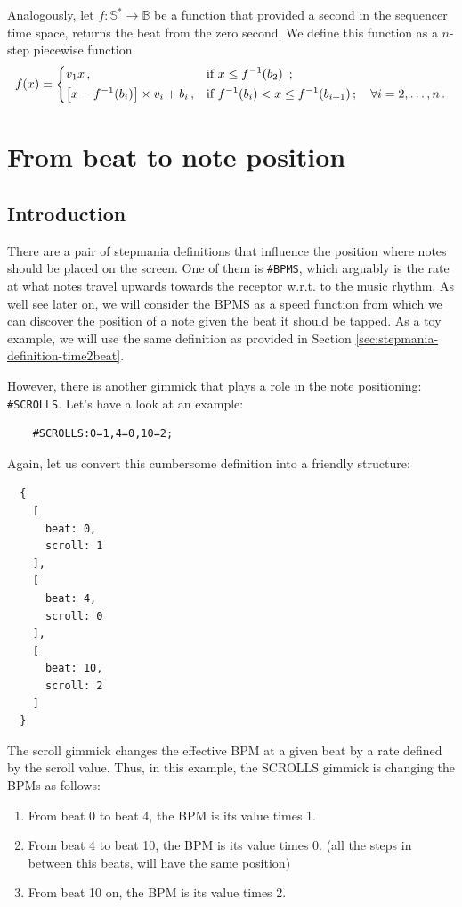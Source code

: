 \documentclass[a4paper,9pt]{article}
\begin{document}
    Analogously, let $ f: \mathbb{S^{*}} \rightarrow \mathbb{B} $ be a function that provided a second in the sequencer time space, returns the beat from the zero second. We define this function as a $n$-step piecewise function
    \begin{equation}
	    f(x) = \begin{dcases}
		    v_1x\,, & \text{if $x \leq f^{-1}(b_{2}) $ }\,;\\
		    \left[x-f^{-1}(b_{i})\right]\times v_i + b_{i}\,, & \text{if $f^{-1}(b_{i}) < x \leq f^{-1}(b_{i+1})\,;\quad \forall i=2,\ldots,n$}\,. \\
	    \end{dcases}
	    \label{eq:beat2second}
    \end{equation}

    \section{From beat to note position}

    \subsection{Introduction}

    There are a pair of stepmania definitions that influence the position where notes should be placed on the screen. One of them is \texttt{\#BPMS}, which arguably is the rate at what notes travel upwards towards the receptor w.r.t. to the music rhythm. As well see later on, we will consider the BPMS as a speed function from which we can discover the position of a note given the beat it should be tapped. As a toy example, we will use the same definition as provided in Section \ref{sec:stepmania-definition-time2beat}. 

    However, there is another gimmick that plays a role in the note positioning: \texttt{\#SCROLLS}. Let's have a look at an example:

    \begin{verbatim}
    #SCROLLS:0=1,4=0,10=2;     
    \end{verbatim}
    Again, let us convert this cumbersome definition into a friendly structure:
    \begin{verbatim}
  {
    [
      beat: 0,
      scroll: 1
    ],
    [
      beat: 4,
      scroll: 0 
    ],
    [
      beat: 10,
      scroll: 2 
    ]
  }
    \end{verbatim}
    The scroll gimmick changes the effective BPM at a given beat by a rate defined by the scroll value. Thus, in this example, the SCROLLS gimmick is changing the BPMs as follows:
    \begin{enumerate}
		\item From beat 0 to beat 4, the BPM is its value times 1.
		\item From beat 4 to beat 10, the BPM is its value times 0. (all the steps in between this beats, will have the same position)
		\item From beat 10 on, the BPM is its value times 2.
    \end{enumerate}
\end{document}
